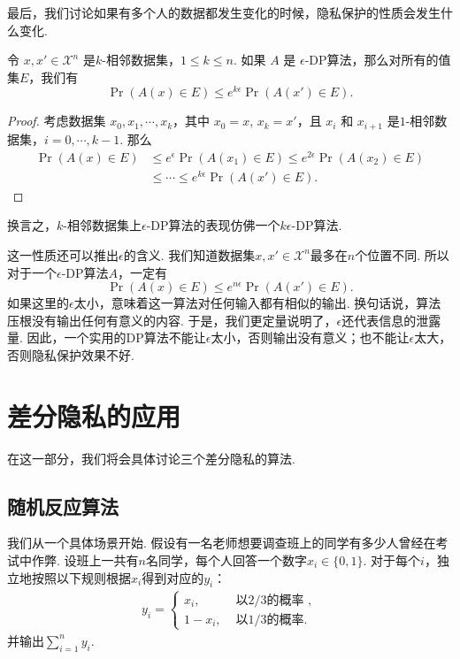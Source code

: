最后，我们讨论如果有多个人的数据都发生变化的时候，隐私保护的性质会发生什么变化. 

\begin{proposition}[群体隐私]\label{prop:group-privacy}
    令 $x, x' \in \mathcal X^n$ 是$k$-相邻数据集，$1 \leq k \leq n$. 如果 $A$ 是 $\epsilon$-DP算法，那么对所有的值集$E$，我们有
    \[
    \Pr(A(x) \in E) \leq e^{k\epsilon}\Pr(A(x') \in E).
    \]
\end{proposition}
\begin{proof}
    考虑数据集 $x_0, x_1, \cdots , x_k$，其中 $x_0 = x$, $x_k = x'$，且 $x_i$ 和 $x_{i+1}$ 是$1$-相邻数据集，$i = 0, \cdots, k-1$. 那么
    \[
    \begin{aligned}
    \Pr(A(x) \in E) &\leq e^{\epsilon}\Pr(A(x_1) \in E) \leq e^{2\epsilon}\Pr(A(x_2) \in E)\\
    &\leq \cdots \leq e^{k\epsilon}\Pr(A(x') \in E).
    \end{aligned}
    \]
\end{proof}

换言之，$k$-相邻数据集上$\epsilon$-DP算法的表现仿佛一个$k\epsilon$-DP算法. 

这一性质还可以推出$\epsilon$的含义. 我们知道数据集$x, x' \in \mathcal X^n$最多在$n$个位置不同. 所以对于一个$\epsilon$-DP算法$A$，一定有
        \[
        \Pr(A(x) \in E) \leq e^{n\epsilon}\Pr(A(x') \in E).
        \]
如果这里的$\epsilon$太小，意味着这一算法对任何输入都有相似的输出. 换句话说，算法压根没有输出任何有意义的内容. 于是，我们更定量说明了，$\epsilon$还代表信息的泄露量. 因此，一个实用的DP算法不能让$\epsilon$太小，否则输出没有意义；也不能让$\epsilon$太大，否则隐私保护效果不好.

\section{差分隐私的应用}
在这一部分，我们将会具体讨论三个差分隐私的算法. 

\subsection{随机反应算法}
我们从一个具体场景开始. 假设有一名老师想要调查班上的同学有多少人曾经在考试中作弊. 设班上一共有$n$名同学，每个人回答一个数字$x_i \in \{0,1\}$. 对于每个$i$，独立地按照以下规则根据$x_i$得到对应的$y_i$：
\[\begin{aligned}
    y_i =
    \begin{cases}
        x_i, & \text{ 以$2/3$的概率 }, \\
        1 - x_i,& \text{ 以$1/3$的概率}.
    \end{cases}
\end{aligned}\]
并输出$\sum_{i=1}^n y_i$. 


